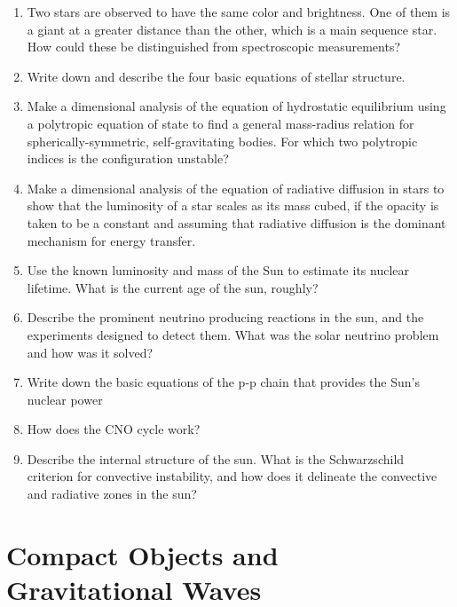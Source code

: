 \documentclass[11pt, oneside]{book}
\begin{document}
\begin{enumerate}[start=16, itemsep=0.4cm]
    \item Two stars are observed to have the same color and brightness. One of them is a giant at a greater distance than the other, which is a main sequence star. How could these be distinguished from spectroscopic measurements?
    \item Write down and describe the four basic equations of stellar structure.
    \item Make a dimensional analysis of the equation of hydrostatic equilibrium using a polytropic equation of state to find a general mass-radius relation for spherically-symmetric, self-gravitating bodies. For which two polytropic indices is the configuration unstable?
    \item Make a dimensional analysis of the equation of radiative diffusion in stars to show that the luminosity of a star scales as its mass cubed, if the opacity is taken to be a constant and assuming that radiative diffusion is the dominant mechanism for energy transfer.
    \item Use the known luminosity and mass of the Sun to estimate its nuclear lifetime. What is the current age of the sun, roughly?
    \item Describe the prominent neutrino producing reactions in the sun, and the experiments designed to detect them. What was the solar neutrino problem and how was it solved?
    \item Write down the basic equations of the p-p chain that provides the Sun's nuclear power
    \item How does the CNO cycle work?
    \item Describe the internal structure of the sun. What is the Schwarzschild criterion for convective instability, and how does it delineate the convective and radiative zones in the sun?
\end{enumerate}

\section{Compact Objects and Gravitational Waves}
\end{document}

